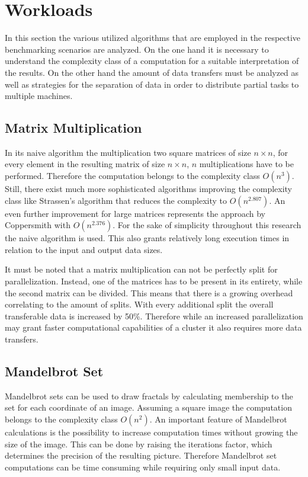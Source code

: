 \section{Workloads}
\label{workload_explanation}
In this section the various utilized algorithms that are employed in the respective benchmarking scenarios are analyzed. On the one hand it is necessary to understand the complexity class of a computation for a suitable interpretation of the results. On the other hand the amount of data transfers must be analyzed as well as strategies for the separation of data in order to distribute partial tasks to multiple machines.

\subsection*{Matrix Multiplication}
\label{matrix_multiplication_workload}
In its naive algorithm the multiplication two square matrices of size $n\times n$, for every element in the resulting matrix of size $n\times n$, $n$ multiplications have to be performed. Therefore the computation belongs to the complexity class $O(n^3)$. Still, there exist much more sophisticated algorithms improving the complexity class like Strassen's algorithm that reduces the complexity to $O(n^{2.807})$\cite{strassen}. An even further improvement for large matrices represents the approach by Coppersmith with $O(n^{2.376})$\cite{coppersmith}. For the sake of simplicity throughout this research the naive algorithm is used. This also grants relatively long execution times in relation to the input and output data sizes.

It must be noted that a matrix multiplication can not be perfectly split for parallelization. Instead, one of the matrices has to be present in its entirety, while the second matrix can be divided. This means that there is a growing overhead correlating to the amount of splits. With every additional split the overall transferable data is increased by 50\%. Therefore while an increased parallelization may grant faster computational capabilities of a cluster it also requires more data transfers.

\subsection*{Mandelbrot Set}

Mandelbrot sets can be used to draw fractals by calculating membership to the set for each coordinate of an image. Assuming a square image the computation belongs to the complexity class $O(n^2)$. An important feature of Mandelbrot calculations is the possibility to increase computation times without growing the size of the image. This can be done by raising the iterations factor, which determines the precision of the resulting picture. Therefore Mandelbrot set computations can be time consuming while requiring only small input data.

